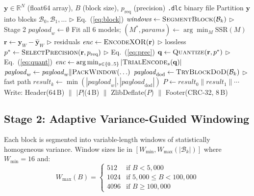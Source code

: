 \documentclass[runningheads]{llncs}
\begin{document}
\begin{algorithm}[t]
\caption{DLC Compression Pipeline}
\label{alg:pipeline}
\begin{algorithmic}[1]
\REQUIRE $\mathbf{y} \in \mathbb{R}^N$ (float64 array), $B$ (block size), $p_{\text{req}}$ (precision)
\ENSURE \texttt{.dlc} binary file
\STATE Partition $\mathbf{y}$ into blocks $\mathcal{B}_0, \mathcal{B}_1, \ldots$ \hfill $\triangleright$ Eq.~(\ref{eq:block})
    \STATE $\mathit{windows} \leftarrow \textsc{SegmentBlock}(\mathcal{B}_k)$ \hfill $\triangleright$ Stage 2
    \STATE $\mathit{payload}_w \leftarrow \emptyset$
        \STATE Fit all 6 models; $(M^*, \mathit{params}) \leftarrow \arg\min_M \text{SSR}(M)$
        \STATE $\mathbf{r} \leftarrow \mathbf{y}_W - \hat{\mathbf{y}}_W$ \hfill $\triangleright$ residuals
            \STATE $\mathit{enc} \leftarrow \textsc{EncodeXOR}(\mathbf{r})$ \hfill $\triangleright$ lossless
        \ELSE
            \STATE $p^* \leftarrow \textsc{SelectPrecision}(\mathbf{r}, p_{\text{req}})$ \hfill $\triangleright$ Eq.~(\ref{eq:prec})
            \STATE $\mathbf{q} \leftarrow \textsc{Quantize}(\mathbf{r}, p^*)$ \hfill $\triangleright$ Eq.~(\ref{eq:quant})
            \STATE $\mathit{enc} \leftarrow \arg\min_{s \in \{0..5\}} |\textsc{TrialEncode}_s(\mathbf{q})|$
        \ENDIF
        \STATE $\mathit{payload}_w \leftarrow \mathit{payload}_w \| \textsc{PackWindow}(\ldots)$
    \ENDFOR
    \STATE $\mathit{payload}_{\text{dod}} \leftarrow \textsc{TryBlockDoD}(\mathcal{B}_k)$ \hfill $\triangleright$ fast path
    \STATE $\mathit{result}_k \leftarrow \min(|\mathit{payload}_w|, |\mathit{payload}_{\text{dod}}|)$
\ENDFOR
\STATE $P \leftarrow \mathit{result}_0 \| \mathit{result}_1 \| \cdots$
\STATE Write: Header(64\,B) $\|$ $|P|$(4\,B) $\|$ ZlibDeflate($P$) $\|$ Footer(CRC-32, 8\,B)
\end{algorithmic}
\end{algorithm}

\subsection{Stage 2: Adaptive Variance-Guided Windowing}

Each block is segmented into variable-length windows of statistically homogeneous variance. Window sizes lie in $[W_{\min}, W_{\max}(|\mathcal{B}_k|)]$ where $W_{\min} = 16$ and:
\begin{equation}
\label{eq:wmax}
W_{\max}(B) = \begin{cases} 512 & \text{if } B < 5{,}000 \\ 1024 & \text{if } 5{,}000 \le B < 100{,}000 \\ 4096 & \text{if } B \ge 100{,}000 \end{cases}
\end{equation}
\end{document}
